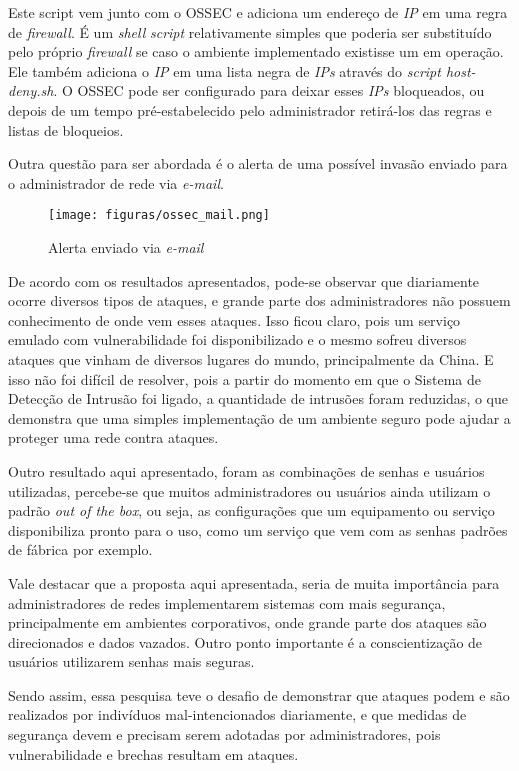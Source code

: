 Este script vem junto com o OSSEC e adiciona um endereço de \textit{IP} em uma regra de \textit{firewall}. É um \textit{shell} \textit{script} relativamente simples que poderia ser substituído pelo próprio \textit{firewall} se caso o ambiente implementado existisse um em operação. Ele também adiciona o \textit{IP} em uma lista negra de \textit{IPs} através do \textit{script host-deny.sh}. O OSSEC pode ser configurado para deixar esses \textit{IPs} bloqueados, ou depois de um tempo pré-estabelecido pelo administrador retirá-los das regras e listas de bloqueios.

Outra questão para ser abordada é o alerta de uma possível invasão enviado para o administrador de rede via \textit{e-mail}.

\begin{figure}[!h]
\centering
\texttt{[image: figuras/ossec\_mail.png]}
\caption{Alerta enviado via \textit{e-mail}} 	
\end{figure}

De acordo com os resultados apresentados, pode-se observar que diariamente ocorre diversos tipos de ataques, e grande parte dos administradores não possuem conhecimento de onde vem esses ataques. Isso ficou claro, pois um serviço emulado com vulnerabilidade foi disponibilizado e o mesmo sofreu diversos ataques que vinham de diversos lugares do mundo, principalmente da China. E isso não foi difícil de resolver, pois a partir do momento em que o Sistema de Detecção de Intrusão foi ligado, a quantidade de intrusões foram reduzidas, o que demonstra que uma simples implementação de um ambiente seguro pode ajudar a proteger uma rede contra ataques.

Outro resultado aqui apresentado, foram as combinações de senhas e usuários utilizadas, percebe-se que muitos administradores ou usuários ainda utilizam o padrão \textit{out of the box}, ou seja, as configurações que um equipamento ou serviço disponibiliza pronto para o uso, como um serviço que vem com as senhas padrões de fábrica por exemplo.

Vale destacar que a proposta aqui apresentada, seria de muita importância para administradores de redes implementarem sistemas com mais segurança, principalmente em ambientes corporativos, onde grande parte dos ataques são direcionados e dados vazados. Outro ponto importante é a conscientização de usuários utilizarem senhas mais seguras.

Sendo assim, essa pesquisa teve o desafio de demonstrar que ataques podem e são realizados por indivíduos mal-intencionados diariamente, e que medidas de segurança devem e precisam serem adotadas por administradores, pois vulnerabilidade e brechas resultam em ataques.
